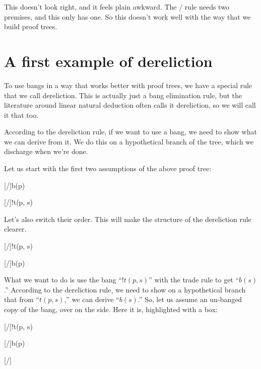 \documentclass[../../../main.tex]{subfiles}
\begin{document}
\noindent
This doesn't look right, and it feels plain awkward. The \traderule/ rule needs two premises, and this only has one. So this doesn't work well with the way that we build proof trees.


\section{A first example of dereliction}

To use bangs in a way that works better with proof trees, we have a special rule that we call dereliction. This is actually just a bang elimination rule, but the literature around linear natural deduction often calls it dereliction, so we will call it that too. 

According to the dereliction rule, if we want to use a bang, we need to show what we can derive from it. We do this on a hypothetical branch of the tree, which we discharge when we're done.

Let us start with the first two assumptions of the above proof tree:

\begin{prooftree*}
  \hypo{}
  [\startrule/]{b(p)}
  
  \hypo{}
  [\startrule/]{!t(p, s)}
  
  
\end{prooftree*}

\noindent
Let's also switch their order. This will make the structure of the dereliction rule clearer.

\begin{prooftree*}
  \hypo{}
  [\startrule/]{!t(p, s)}

  \hypo{}
  [\startrule/]{b(p)}
  
\end{prooftree*}

\noindent
What we want to do is use the bang ``$!t(p, s)$'' with the trade rule to get ``$b(s)$.'' According to the dereliction rule, we need to show on a hypothetical branch that from ``$t(p, s)$,'' we can derive ``$b(s)$.'' So, let us assume an un-banged copy of the bang, over on the side. Here it is, highlighted with a box:

\begin{prooftree*}
  \hypo{}
  [\startrule/]{!t(p, s)}

  \hypo{}
  [\startrule/]{b(p)}

  \hypo{}
  [\startrule/]{}
  
\end{prooftree*}
\end{document}
